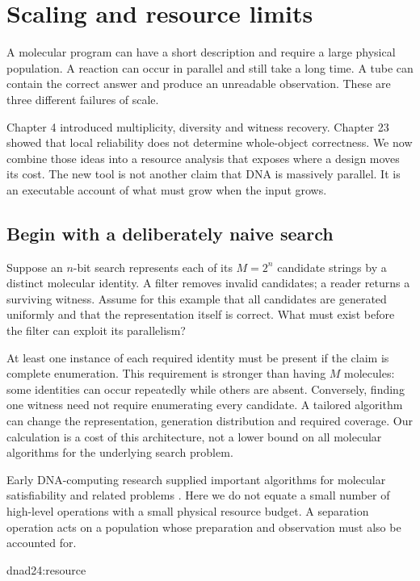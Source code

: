 \chapter{Scaling and resource limits}
\label{dnad24:chapter}
A molecular program can have a short description and require a large physical
population. A reaction can occur in parallel and still take a long time. A tube
can contain the correct answer and produce an unreadable observation. These are
three different failures of scale.

Chapter 4 introduced multiplicity, diversity and witness recovery. Chapter 23
showed that local reliability does not determine whole-object correctness.
We now combine those ideas into a resource analysis that exposes where a design
moves its cost. The new tool is not another claim that DNA is massively parallel.
It is an executable account of what must grow when the input grows.

\section{Begin with a deliberately naive search}
Suppose an $n$-bit search represents each of its $M=2^n$ candidate strings by
a distinct molecular identity. A filter removes invalid candidates; a reader
returns a surviving witness. Assume for this example that all candidates are
generated uniformly and that the representation itself is correct.
What must exist before the filter can exploit its parallelism?

At least one instance of each required identity must be present if the claim is
complete enumeration. This requirement is stronger than having $M$ molecules:
some identities can occur repeatedly while others are absent. Conversely,
finding one witness need not require enumerating every candidate. A tailored
algorithm can change the representation, generation distribution and required
coverage. Our calculation is a cost of this architecture, not a lower bound on
all molecular algorithms for the underlying search problem.

Early DNA-computing research supplied important algorithms for molecular
satisfiability and related problems \cite{dnad24:boneh}. Here we do not equate
a small number of high-level operations with a small physical resource budget.
A separation operation acts on a population whose preparation and observation
must also be accounted for.

{dnad24:resource}


